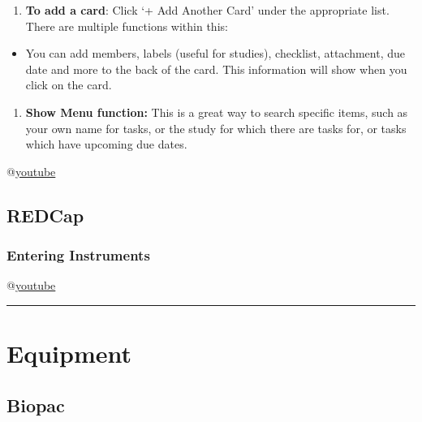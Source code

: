 \documentclass[]{book}
\providecommand{\tightlist}{%
  \setlength{\itemsep}{0pt}\setlength{\parskip}{0pt}}
\begin{document}
\begin{enumerate}
\def\labelenumi{\arabic{enumi}.}
\setcounter{enumi}{1}
\tightlist
\item
  \textbf{To add a card}: Click `+ Add Another Card' under the appropriate list. There are multiple functions within this:
\end{enumerate}

\begin{itemize}
\tightlist
\item
  You can add members, labels (useful for studies), checklist, attachment, due date and more to the back of the card. This information will show when you click on the card.
\end{itemize}

\begin{enumerate}
\def\labelenumi{\arabic{enumi}.}
\setcounter{enumi}{2}
\tightlist
\item
  \textbf{Show Menu function:} This is a great way to search specific items, such as your own name for tasks, or the study for which there are tasks for, or tasks which have upcoming due dates.
\end{enumerate}

@\href{https://youtu.be/_Ry-SnJygy8}{youtube}

\hypertarget{redcap}{%
\subsection{REDCap}\label{redcap}}

\hypertarget{entering-instruments}{%
\subsubsection{Entering Instruments}\label{entering-instruments}}

@\href{https://youtu.be/aKdWA0ABOrU}{youtube}

\begin{center}\rule{0.5\linewidth}{\linethickness}\end{center}

\hypertarget{equipment}{%
\section{Equipment}\label{equipment}}

\hypertarget{biopac}{%
\subsection{Biopac}\label{biopac}}
\end{document}
